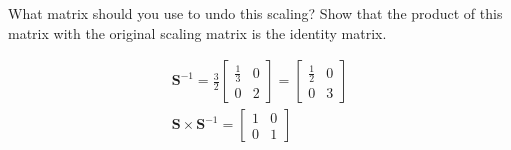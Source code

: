 What matrix should you use to undo this scaling? Show that the product of this matrix with the original scaling matrix is the identity matrix.

\begin{solution}
\begin{align*}
    \boldsymbol{S}^{-1} = \frac{3}{2}\begin{bmatrix}
        \frac{1}{3} & 0 \\
        0 & 2
    \end{bmatrix} = \begin{bmatrix}
        \frac{1}{2} & 0 \\
        0 & 3
    \end{bmatrix}\\
    \boldsymbol{S} \times \boldsymbol{S}^{-1} = \begin{bmatrix}
        1 & 0 \\
        0 & 1
    \end{bmatrix}
\end{align*}
\end{solution}